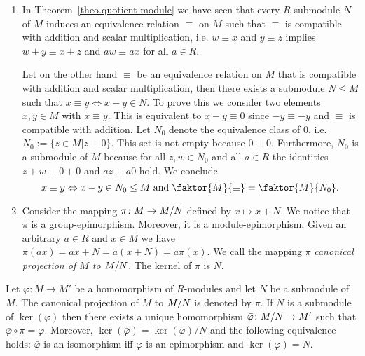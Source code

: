 \begin{rem}
\begin{enumerate}
\item In Theorem~\ref{theo.quotient module} we have seen that every $R$-submodule $N$ of $M$ induces an equivalence relation $\equiv$ on $M$  such that $\equiv$ is compatible with addition and scalar multiplication, i.e. $w\equiv x$ and $y\equiv z$ implies $w+y\equiv x+z$ and $aw\equiv ax$ for all $a\in R$. 

Let on the other hand $\equiv$ be an equivalence relation on $M$ that is compatible with addition and scalar multiplication, then there exists a submodule $N\leq M$ such that $x\equiv y\Leftrightarrow x-y\in N$. To prove this we consider two elements $x,y\in M$ with $x\equiv y$. This is equivalent to $x-y\equiv 0$ since $-y\equiv -y$ and $\equiv$ is compatible with addition. Let $N_0$ denote the equivalence class of 0, i.e. $N_0:=\lbrace z\in M|z\equiv 0\rbrace$. This set is not empty because $0\equiv 0$. Furthermore, $N_0$ is a submodule of $M$ because for all $z ,w\in N_0$ and all $a\in R$ the identities $z +w\equiv 0+0$ and $az\equiv a0$ hold. We conclude
\begin{equation*}
x\equiv y\Leftrightarrow x-y\in N_0\leq M \;\text{and}\; \faktor{M}{\equiv}=\faktor{M}{N_0}.
\end{equation*}
\item Consider the mapping $\pi\colon M\rightarrow M/N$ defined by $x\mapsto x+N$. We notice that $\pi$ is a group-epimorphism. Moreover, it is a module-epimorphism. Given an arbitrary $a\in R$ and $x\in M$ we have $\pi(ax)=ax+N=a(x+N)=a\pi(x)$. We call the mapping $\pi$ \emph{canonical projection of $M$ to $M/N$}. The kernel of $\pi$ is $N$.
\end{enumerate}
\end{rem}

\begin{thm}\label{theo.Universal Property}
Let $\varphi\colon M \to M'$ be a homomorphism of $R$-modules and let $N$ be a submodule of $M$. The canonical projection of $M$ to $M/N$ is denoted by $\pi$. If $N$ is a submodule of $\ker(\varphi)$ then there exists a unique homomorphism $\bar{\varphi}\colon M/N\rightarrow M'$ such that $\bar{\varphi}\circ\pi=\varphi$. Moreover, $\ker(\bar{\varphi})=\ker(\varphi)/N$ and the following equivalence holds: $\bar{\varphi}$ is an isomorphism iff $\varphi$ is an epimorphism and $\ker(\varphi)=N$.
\end{thm}

